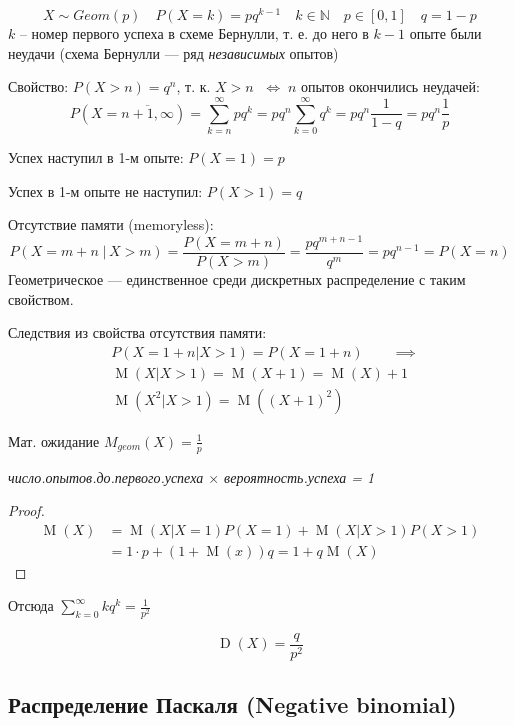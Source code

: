 \documentclass[a4paper,12pt,fleqn]{article}
\newenvironment{onsamepage} {\begin{minipage}{\textwidth}} {\end{minipage}}
\numberwithin{figure}{section}
\theoremstyle{definition}
\def\N{\mathbb{N}}
\DeclareMathOperator{\M}{M}
\DeclareMathOperator{\D}{D}
\def\iff{$\;\Longleftrightarrow\;$}
\begin{document}
\[ X \sim Geom(p) \quad P(X=k)=pq^{k-1} \quad
k\in\N \quad p\in[0,1] \quad q=1-p \]
$k$ -- номер первого успеха в схеме Бернулли, т. е. до него в $k-1$ опыте были неудачи
(схема Бернулли --- ряд \textit{независимых} опытов)

Свойство: $P(X>n) = q^n$, т. к. $X>n$ \iff $n$ опытов окончились неудачей:
  \[ P(X=\overline{n+1,\infty}) = \sum_{k=n}^{\infty}pq^k
       = pq^n \sum_{k=0}^{\infty} q^k = pq^n\frac1{1-q} = pq^n\frac1p \]

Успех наступил в 1-м опыте: $P(X=1) = p$

Успех в 1-м опыте не наступил: $P(X>1) = q$

Отсутствие памяти (memoryless):
\[ P(X=m+n \;|\, X>m) = \dfrac{P(X=m+n)}{P(X>m)}
   = \dfrac{pq^{m+n-1}}{q^m} = pq^{n-1} = P(X=n) \]
Геометрическое --- единственное среди дискретных распределение с таким свойством.

\begin{onsamepage}
Следствия из свойства отсутствия памяти:
\begin{align*}
&	P(X=1+n|X>1) = P(X=1+n)  \qquad \implies \\
&	\M(X|X>1) = \M(X+1) = \M(X)+1  \\
&	\M(X^2|X>1) = \M\left( (X+1)^2 \right)
\end{align*}
\end{onsamepage}

\begin{onsamepage}
Мат. ожидание $M_{geom}(X) = \frac1p$
{\par\centering\it число.опытов.до.первого.успеха $\times$ вероятность.успеха = \rm1 \par}
\begin{proof}
\begin{align*}
 \M(X) &= \M(X|X=1) P(X=1) + \M(X|X>1) P(X>1) \\
	   &= 1\cdot p + (1+\M(x))q = 1 + q \M(X)
\end{align*}
\end{proof}
Отсюда $\sum_{k=0}^{\infty}kq^k = \frac1{p^2}$
\end{onsamepage}

\[ \D(X)=\frac{q}{p^2} \]


\subsection{Распределение Паскаля (Negative binomial)}
\end{document}
